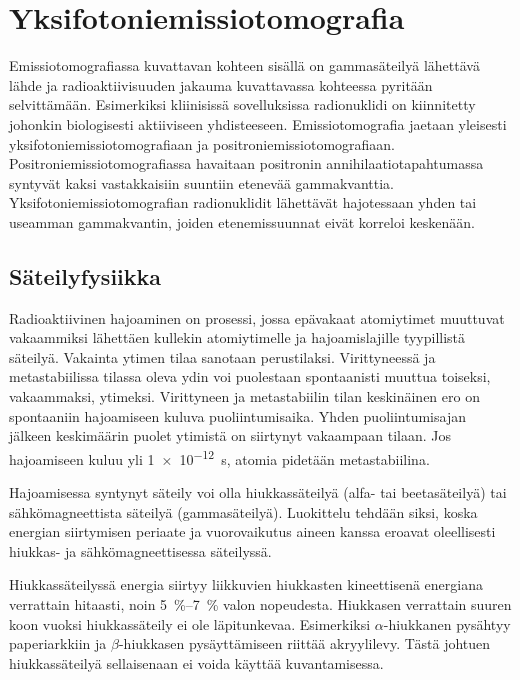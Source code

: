 \section{Yksifotoniemissiotomografia}
Emissiotomografiassa kuvattavan kohteen sisällä on gammasäteilyä lähettävä lähde ja radioaktiivisuuden jakauma kuvattavassa kohteessa pyritään selvittämään\cite{bruyant_analytic_2002, cherry_gamma_2012, van_audenhaege_review_2015}. Esimerkiksi kliinisissä sovelluksissa radionuklidi on kiinnitetty johonkin biologisesti aktiiviseen yhdisteeseen\cite{cherry_single_2012, van_audenhaege_review_2015, bruyant_analytic_2002}. Emissiotomografia jaetaan yleisesti yksifotoniemissiotomografiaan ja positroniemissiotomografiaan. Positroniemissiotomografiassa havaitaan positronin annihilaatiotapahtumassa syntyvät kaksi vastakkaisiin suuntiin etenevää gammakvanttia\cite{cherry_single_2012}. Yksifotoniemissiotomografian radionuklidit lähettävät hajotessaan yhden tai useamman gammakvantin, joiden etenemissuunnat eivät korreloi keskenään\cite{cherry_single_2012, van_audenhaege_review_2015}.

\subsection{Säteilyfysiikka}
Radioaktiivinen hajoaminen on prosessi, jossa epävakaat atomiytimet muuttuvat vakaammiksi lähettäen kullekin atomiytimelle ja hajoamislajille tyypillistä säteilyä. Vakainta ytimen tilaa sanotaan perustilaksi. Virittyneessä ja metastabiilissa tilassa oleva ydin voi puolestaan spontaanisti muuttua toiseksi, vakaammaksi, ytimeksi. Virittyneen ja metastabiilin tilan keskinäinen ero on spontaaniin hajoamiseen kuluva puoliintumisaika. Yhden puoliintumisajan jälkeen keskimäärin puolet ytimistä on siirtynyt vakaampaan tilaan. Jos hajoamiseen kuluu yli \qty{1e-12}{\second}, atomia pidetään metastabiilina\cite{cherry_basic_2012}.

Hajoamisessa syntynyt säteily voi olla hiukkassäteilyä (alfa- tai beetasäteilyä) tai sähkömagneettista säteilyä (gammasäteilyä).\cite{cherry_basic_2012, cherry_interaction_2012} Luokittelu tehdään siksi, koska energian siirtymisen periaate ja vuorovaikutus aineen kanssa eroavat oleellisesti hiukkas- ja sähkömagneettisessa säteilyssä.

Hiukkassäteilyssä energia siirtyy liikkuvien hiukkasten kineettisenä energiana verrattain hitaasti, noin \qtyrange{5}{7}{\percent} valon nopeudesta. Hiukkasen verrattain suuren koon vuoksi hiukkassäteily ei ole läpitunkevaa. Esimerkiksi $\alpha$-hiukkanen pysähtyy paperiarkkiin ja $\beta$-hiukkasen pysäyttämiseen riittää akryylilevy.\cite{cherry_interaction_2012} Tästä johtuen hiukkassäteilyä sellaisenaan ei voida käyttää kuvantamisessa\cite{cherry_gamma_2012}.


